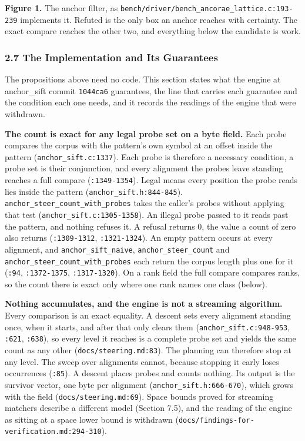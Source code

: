 \noindent\textbf{Figure 1.} The anchor filter, as \texttt{bench/\allowbreak{}driver/\allowbreak{}bench\_\allowbreak{}ancorae\_\allowbreak{}lattice.\allowbreak{}c:193-\allowbreak{}239} implements it. Refuted is the only box an anchor reaches with certainty. The exact compare reaches the other two, and everything below the candidate is work.

\subsubsection{2.7 The Implementation and Its Guarantees}

The propositions above need no code. This section states what the engine at anchor\_sift commit \texttt{1044ca6} guarantees, the line that carries each guarantee and the condition each one needs, and it records the readings of the engine that were withdrawn.

\noindent\textbf{The count is exact for any legal probe set on a byte field.} Each probe compares the corpus with the pattern's own symbol at an offset inside the pattern (\texttt{anchor\_sift.c:1337}). Each probe is therefore a necessary condition, a probe set is their conjunction, and every alignment the probes leave standing reaches a full compare (\texttt{:1349-1354}). Legal means every position the probe reads lies inside the pattern (\texttt{anchor\_sift.h:844-845}). \texttt{anchor\_steer\_count\_with\_probes} takes the caller's probes without applying that test (\texttt{anchor\_sift.c:1305-1358}). An illegal probe passed to it reads past the pattern, and nothing refuses it. A refusal returns 0, the value a count of zero also returns (\texttt{:1309-1312}, \texttt{:1321-1324}). An empty pattern occurs at every alignment, and \texttt{anchor\_sift\_naive}, \texttt{anchor\_steer\_count} and \texttt{anchor\_steer\_count\_with\_probes} each return the corpus length plus one for it (\texttt{:94}, \texttt{:1372-1375}, \texttt{:1317-1320}). On a rank field the full compare compares ranks, so the count there is exact only where one rank names one class (below).

\noindent\textbf{Nothing accumulates, and the engine is not a streaming algorithm.} Every comparison is an exact equality. A descent sets every alignment standing once, when it starts, and after that only clears them (\texttt{anchor\_sift.c:948-953}, \texttt{:621}, \texttt{:638}), so every level it reaches is a complete probe set and yields the same count as any other (\texttt{docs/\allowbreak{}steering.md:83}). The planning can therefore stop at any level. The sweep over alignments cannot, because stopping it early loses occurrences (\texttt{:85}). A descent places probes and counts nothing. Its output is the survivor vector, one byte per alignment (\texttt{anchor\_sift.h:666-670}), which grows with the field (\texttt{docs/\allowbreak{}steering.md:69}). Space bounds proved for streaming matchers describe a different model (Section 7.5), and the reading of the engine as sitting at a space lower bound is withdrawn (\texttt{docs/\allowbreak{}findings-\allowbreak{}for-\allowbreak{}verification.md:294-\allowbreak{}310}).

